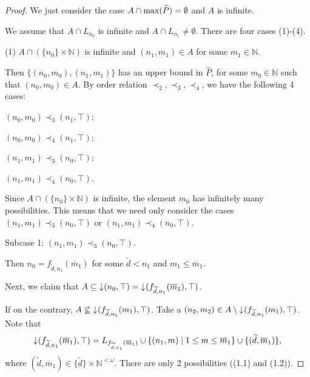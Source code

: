 \documentclass[preprint,12pt]{elsarticle}
\numberwithin{equation}{section}
\newcommand{\dn}{\mathord{\downarrow}\hspace{0.05em}}
\begin{document}
\begin{proof}We just consider the case $A\cap {\rm max}(\widehat{P})=\emptyset$ and $A$ is infinite.

We assume that $A\cap L_{n_{0}}$ is infinite and $A\cap L_{n_{1}}\neq\emptyset$. There are four cases (1)-(4).

(1) $A\cap (\{n_{0}\}\times \mathbb{N})$ is infinite and $(n_{1},m_{1})\in A$ for some $m_{1}\in\mathbb{N}$.

Then $\{(n_{0},m_{0}),(n_{1},m_{1})\}$ has an upper bound in $\widehat{P}$, for some $m_{0}\in\mathbb{N}$ such that $(n_{0},m_{0})\in A$. By order relation $\prec_{2},\prec_{3},\prec_{4}$, we have the following 4 cases:

$(n_{0},m_{0})\prec_{3}(n_{1},\top)$;

$(n_{0},m_{0})\prec_{4}(n_{1},\top)$;

$(n_{1},m_{1})\prec_{3}(n_{0},\top)$;

$(n_{1},m_{1})\prec_{4}(n_{0},\top)$.

Since  $A\cap (\{n_{0}\}\times \mathbb{N})$ is infinite, the element $m_{0}$ has infinitely many possibilities. This means that we need only consider the cases $(n_{1},m_{1})\prec_{3}(n_{0},\top)$ or $(n_{1},m_{1})\prec_{4}(n_{0},\top)$.


Subcase 1: $(n_{1},m_{1})\prec_{3}(n_{0},\top)$.

Then $n_{0}=f_{\widetilde{d},n_{1}}(\overline{m}_{1})$ for some $\widetilde{d}<n_{1}$ and $m_{1}\leq\overline{m}_{1}$.

Next, we claim that $A\subseteq \dn (n_{0},\top)=\dn (f_{\widetilde{d},n_{1}}(\overline{m}_{1}),\top)$.

If on the contrary, $A\not\subseteq\dn (f_{\widetilde{d},n_{1}}(m_{1}),\top)$. Take a $(n_{2},m_{2})\in A\setminus\dn (f_{\widetilde{d},n_{1}}(m_{1}),\top)$. Note that
$$\dn (f_{\widetilde{d},n_{1}}(\overline{m}_{1}),\top)=L_{f_{\widetilde{d},n_{1}}(\overline{m}_{1})}\cup \{(n_{1},m)\mid 1\leq m\leq \overline{m}_{1}\}\cup\{(\widetilde{d},\overline{m}_{1})\},$$
where $(\widetilde{d},\overline{m}_{1})\in \{\widetilde{d}\}\times \mathbb{N}^{<\omega}$. There are only 2 possibilities ((1.1) and (1.2)).




\end{proof}
\end{document}
